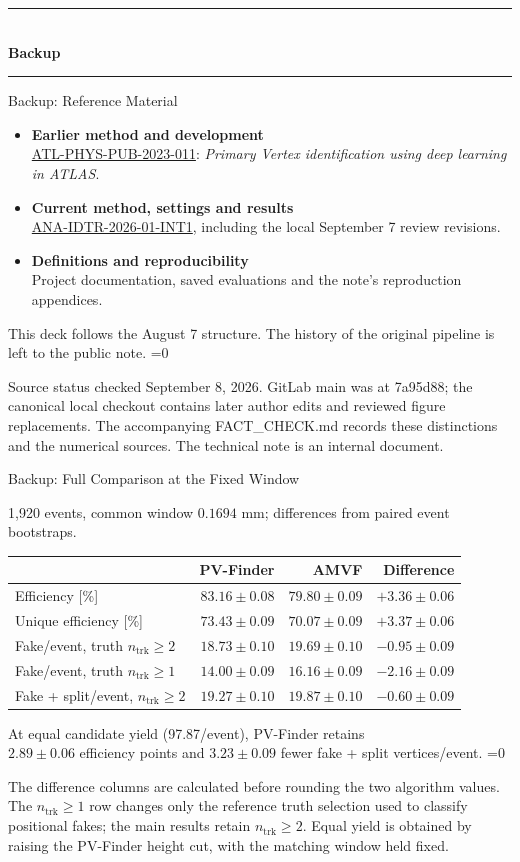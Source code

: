 \documentclass[xcolor=table,aspectratio=169]{beamer}
\newcommand{\backupbegin}{
    \newcounter{finalframe}
    \setcounter{finalframe}{\value{framenumber}}
    \setbeamertemplate{footline}{}
    \begin{frame}[plain]
        \centering
        \vfill
        {\color{pennred!28}\rule{0.30\linewidth}{1.1pt}}\\[0.8em]
        {\LARGE\textbf{\textcolor{pennred}{Backup}}}\\[0.8em]
        {\color{pennred!28}\rule{0.30\linewidth}{1.1pt}}
        \vfill
    \end{frame}
}
\newcommand{\ntrk}{\ensuremath{n_\mathrm{trk}}}
\providecommand{\talkbuild}{0}
\newcommand{\readingonly}[1]{\ifnum\talkbuild=0\relax#1\fi}
\newcommand{\readingnote}[1]{\readingonly{\par\vspace{.35em}%
  {\footnotesize\color{black!65}#1\par}}}
\newcommand{\context}[1]{{\centering\footnotesize\color{black!55}#1\par}\vspace{.65em}}
\newcommand{\pubnote}{\href{https://cds.cern.ch/record/2858348}{ATL-PHYS-PUB-2023-011}}
\newcommand{\notelink}{\href{https://gitlab.cern.ch/atlas-physics-office/IDTR/ANA-IDTR-2026-01/ANA-IDTR-2026-01-INT1}{ANA-IDTR-2026-01-INT1}}
\begin{document}
\backupbegin

\begin{frame}{Backup: Reference Material}
\relax

\begin{itemize}\setlength\itemsep{1em}
\item \textbf{Earlier method and development}\\[.4em]
\pubnote: \emph{Primary Vertex identification using deep learning in ATLAS}.
\item \textbf{Current method, settings and results}\\[.4em]
\notelink, including the local September 7 review revisions.
\item \textbf{Definitions and reproducibility}\\[.4em]
Project documentation, saved evaluations and the note's reproduction appendices.
\end{itemize}
\par\vspace{1em}\small
This deck follows the August 7 structure. The history of the original pipeline is left to the public note.
\readingnote{Source status checked September 8, 2026. GitLab main was at 7a95d88; the canonical local checkout contains later author edits and reviewed figure replacements. The accompanying FACT\_CHECK.md records these distinctions and the numerical sources. The technical note is an internal document.}
\end{frame}


\begin{frame}{Backup: Full Comparison at the Fixed Window}
\relax

\context{1,920 events, common window $0.1694$ mm; differences from paired event bootstraps.}
\centering\footnotesize
\begin{tabular}{lrrr}\toprule
 & PV-Finder & AMVF & Difference\\\midrule
Efficiency [\%] & $83.16\pm0.08$ & $79.80\pm0.09$ & $+3.36\pm0.06$\\
Unique efficiency [\%] & $73.43\pm0.09$ & $70.07\pm0.09$ & $+3.37\pm0.06$\\
Fake/event, truth $\ntrk\geq2$ & $18.73\pm0.10$ & $19.69\pm0.10$ & $-0.95\pm0.09$\\
Fake/event, truth $\ntrk\geq1$ & $14.00\pm0.09$ & $16.16\pm0.09$ & $-2.16\pm0.09$\\
Fake + split/event, $\ntrk\geq2$ & $19.27\pm0.10$ & $19.87\pm0.10$ & $-0.60\pm0.09$\\\bottomrule
\end{tabular}
\par\vspace{1.2em}\small
At equal candidate yield (97.87/event), PV-Finder retains\\[.4em]
$2.89\pm0.06$ efficiency points and $3.23\pm0.09$ fewer fake + split vertices/event.
\readingnote{The difference columns are calculated before rounding the two algorithm values. The $\ntrk\geq1$ row changes only the reference truth selection used to classify positional fakes; the main results retain $\ntrk\geq2$. Equal yield is obtained by raising the PV-Finder height cut, with the matching window held fixed.}
\end{frame}
\end{document}
